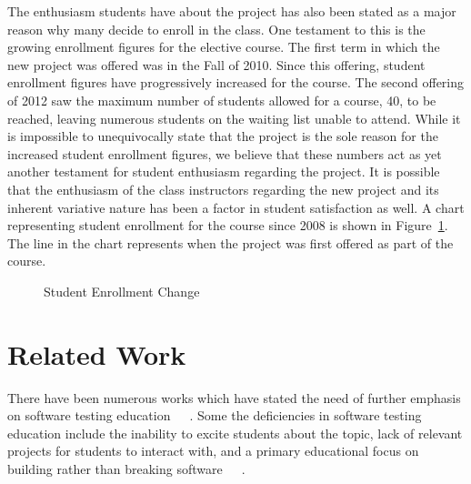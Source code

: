 \documentclass{sig-alternate}
\begin{document}
The enthusiasm students have about the project has also been stated as a major reason why many decide to enroll in the class. One testament to this is the growing enrollment figures for the elective course. The first term in which the new project was offered was in the Fall of 2010. Since this offering, student enrollment figures have progressively increased for the course. The second offering of 2012 saw the maximum number of students allowed for a course, 40, to be reached, leaving numerous students on the waiting list unable to attend. While it is impossible to unequivocally state that the project is the sole reason for the increased student enrollment figures, we believe that these numbers act as yet another testament for student enthusiasm regarding the project. It is possible that the enthusiasm of the class instructors regarding the new project and its inherent variative nature has been a factor in student satisfaction as well. A chart representing student enrollment for the course since 2008 is shown in Figure~\ref{fig:enrollmentchange}. The line in the chart represents when the project was first offered as part of the course.

\begin{figure}[h!]

\caption{Student Enrollment Change}
\label{fig:enrollmentchange}
\end{figure}


\section{Related Work}
\label{sec: relatedwork}

There have been numerous works which have stated the need of further emphasis on software testing education~\cite{Clark:2004:PTS:979968.979974}~\cite{4271602}~\cite{Edwards:2003:TST:949344.949431}.  Some the deficiencies in software testing education include the inability to excite students about the topic, lack of relevant projects for students to interact with, and a primary educational focus on building rather than breaking software~\cite{Meneely:2013:VDC:2486788.2486948}~\cite{Harrison:2010:TST:1858583.1858591}~\cite{Clark:2004:PTS:979968.979974}.
\end{document}
